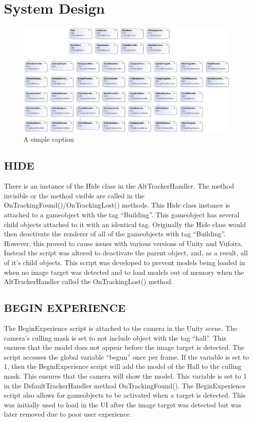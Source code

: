 \chapter{System Design}
\begin{figure}[ht!]
	\centering
	\includegraphics[width=150mm]{uml.jpg}
	\caption{A simple caption \label{overflow}}
\end{figure}

\section{HIDE}
There is an instance of the Hide class in the AltTrackerHandler. The method invisible or the method visible are called in the OnTrackingFound()/OnTrackingLost() methods. This Hide class instance is attached to a gameobject with the tag “Building”. This gameobject has several child objects attached to it with an identical tag. Originally the Hide class would then deactivate the renderer of all of the gameobjects with tag “Building”.  However, this proved to cause issues with various versions of Unity and Vufoira. Instead the script was altered to deactivate the parent object, and, as a result, all of it's child objects. This script was developed to prevent models being loaded in when no image target was detected and to load models out of memory when the AltTrackerHandler called the OnTrackingLost() method.

\section{BEGIN EXPERIENCE}
The BeginExperience script is attached to the camera in the Unity scene. The camera's culling mask is set to not include object with the tag “hall”. This ensures that the model does not appear before the image target is detected. The script accesses the global variable “begun” once per frame. If the variable is set to 1, then the BeginExperience script will add the model of the Hall to the culling mask. This ensures that the camera will show the model. This variable is set to 1 in the DefaultTrackerHandler method OnTrackingFound(). The BeginExperience script also allows for gameobjects to be activated when a target is detected. This was initially used to load in the UI after the image target was detected but was later removed due to poor user experience. 

